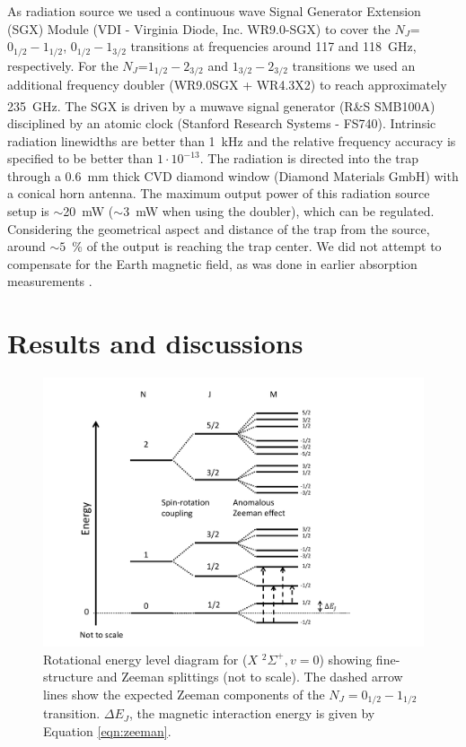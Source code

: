 As radiation source we used a continuous wave Signal Generator Extension (SGX) Module (VDI - Virginia Diode, Inc. WR9.0-SGX) to cover the $N_J$=$0_{1/2}-1_{1/2}$, $0_{1/2}-1_{3/2}$ transitions at frequencies around 117 and 118~GHz, respectively. For the  $N_J$=$1_{1/2}-2_{3/2}$ and $1_{3/2}-2_{3/2}$ transitions we used an additional frequency doubler (WR9.0SGX + WR4.3X2) to reach approximately 235~GHz. The SGX is driven by a  muwave signal generator (R\&S \textsuperscript{\textregistered} SMB100A) disciplined by an atomic clock (Stanford Research Systems - FS740). Intrinsic radiation linewidths are better than 1~kHz and the relative frequency accuracy is specified to be better than $1\cdot 10^{-13}$. The radiation is directed into the trap through a 0.6~mm thick CVD diamond window (Diamond Materials GmbH) with a conical horn antenna. The maximum output power of this radiation source setup is $\sim$20~mW ($\sim$3~mW when using the doubler), which can be regulated. Considering the geometrical aspect and distance of the trap from the source, around $\sim 5$~\% of the output is reaching the trap center. We did not attempt to compensate for the Earth magnetic field, as was done in earlier absorption measurements \cite{Bogey1982}.

\section{Results and discussions}

\begin{figure}[!htb]
    \centering
    \includegraphics[scale=0.4]{chapters/CO+_ROSAA_paper/CO+_energy_levels.pdf}
    \caption{Rotational energy level diagram for \co ($X$ $^2\Sigma ^+, v=0$) showing fine-structure and Zeeman splittings (not to scale). The dashed arrow lines show the expected Zeeman components of the $N_J=0_{1/2}-1_{1/2}$ transition. $\Delta E_J$, the magnetic interaction energy is given by Equation \ref{eqn:zeeman}.}
    \label{fig:energy}
\end{figure}

